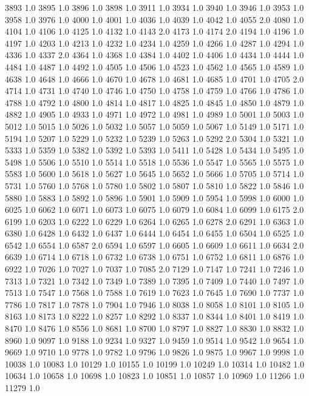 3893	1.0
3895	1.0
3896	1.0
3898	1.0
3911	1.0
3934	1.0
3940	1.0
3946	1.0
3953	1.0
3958	1.0
3976	1.0
4000	1.0
4001	1.0
4036	1.0
4039	1.0
4042	1.0
4055	2.0
4080	1.0
4104	1.0
4106	1.0
4125	1.0
4132	1.0
4143	2.0
4173	1.0
4174	2.0
4194	1.0
4196	1.0
4197	1.0
4203	1.0
4213	1.0
4232	1.0
4234	1.0
4259	1.0
4266	1.0
4287	1.0
4294	1.0
4336	1.0
4337	2.0
4364	1.0
4368	1.0
4384	1.0
4402	1.0
4406	1.0
4434	1.0
4444	1.0
4484	1.0
4487	1.0
4492	1.0
4505	1.0
4506	1.0
4523	1.0
4562	1.0
4565	1.0
4589	1.0
4638	1.0
4648	1.0
4666	1.0
4670	1.0
4678	1.0
4681	1.0
4685	1.0
4701	1.0
4705	2.0
4714	1.0
4731	1.0
4740	1.0
4746	1.0
4750	1.0
4758	1.0
4759	1.0
4766	1.0
4786	1.0
4788	1.0
4792	1.0
4800	1.0
4814	1.0
4817	1.0
4825	1.0
4845	1.0
4850	1.0
4879	1.0
4882	1.0
4905	1.0
4933	1.0
4971	1.0
4972	1.0
4981	1.0
4989	1.0
5001	1.0
5003	1.0
5012	1.0
5015	1.0
5026	1.0
5032	1.0
5057	1.0
5059	1.0
5067	1.0
5149	1.0
5171	1.0
5194	1.0
5207	1.0
5229	1.0
5232	1.0
5239	1.0
5263	1.0
5292	2.0
5304	1.0
5321	1.0
5333	1.0
5359	1.0
5382	1.0
5392	1.0
5393	1.0
5411	1.0
5428	1.0
5434	1.0
5495	1.0
5498	1.0
5506	1.0
5510	1.0
5514	1.0
5518	1.0
5536	1.0
5547	1.0
5565	1.0
5575	1.0
5583	1.0
5600	1.0
5618	1.0
5627	1.0
5645	1.0
5652	1.0
5666	1.0
5705	1.0
5714	1.0
5731	1.0
5760	1.0
5768	1.0
5780	1.0
5802	1.0
5807	1.0
5810	1.0
5822	1.0
5846	1.0
5880	1.0
5883	1.0
5892	1.0
5896	1.0
5901	1.0
5909	1.0
5954	1.0
5998	1.0
6000	1.0
6025	1.0
6062	1.0
6071	1.0
6073	1.0
6075	1.0
6079	1.0
6084	1.0
6099	1.0
6175	2.0
6199	1.0
6203	1.0
6222	1.0
6229	1.0
6264	1.0
6265	1.0
6278	2.0
6291	1.0
6363	1.0
6380	1.0
6428	1.0
6432	1.0
6437	1.0
6444	1.0
6454	1.0
6455	1.0
6504	1.0
6525	1.0
6542	1.0
6554	1.0
6587	2.0
6594	1.0
6597	1.0
6605	1.0
6609	1.0
6611	1.0
6634	2.0
6639	1.0
6714	1.0
6718	1.0
6732	1.0
6738	1.0
6751	1.0
6752	1.0
6811	1.0
6876	1.0
6922	1.0
7026	1.0
7027	1.0
7037	1.0
7085	2.0
7129	1.0
7147	1.0
7241	1.0
7246	1.0
7313	1.0
7321	1.0
7342	1.0
7349	1.0
7389	1.0
7395	1.0
7409	1.0
7440	1.0
7497	1.0
7513	1.0
7547	1.0
7568	1.0
7588	1.0
7619	1.0
7623	1.0
7645	1.0
7690	1.0
7737	1.0
7786	1.0
7817	1.0
7878	1.0
7904	1.0
7946	1.0
8038	1.0
8058	1.0
8101	1.0
8105	1.0
8163	1.0
8173	1.0
8222	1.0
8257	1.0
8292	1.0
8337	1.0
8344	1.0
8401	1.0
8419	1.0
8470	1.0
8476	1.0
8556	1.0
8681	1.0
8700	1.0
8797	1.0
8827	1.0
8830	1.0
8832	1.0
8960	1.0
9097	1.0
9188	1.0
9234	1.0
9327	1.0
9459	1.0
9514	1.0
9542	1.0
9654	1.0
9669	1.0
9710	1.0
9778	1.0
9782	1.0
9796	1.0
9826	1.0
9875	1.0
9967	1.0
9998	1.0
10038	1.0
10083	1.0
10129	1.0
10155	1.0
10199	1.0
10249	1.0
10314	1.0
10482	1.0
10634	1.0
10658	1.0
10698	1.0
10823	1.0
10851	1.0
10857	1.0
10969	1.0
11266	1.0
11279	1.0
